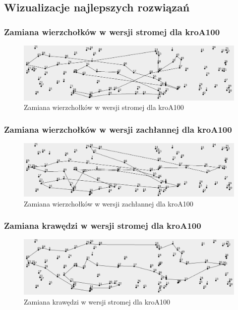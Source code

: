 \documentclass[a4paper]{article}
\begin{document}
\subsection{Wizualizacje najlepszych rozwiązań}

\subsubsection{Zamiana wierzchołków w wersji stromej dla kroA100}

\begin{figure}[H]
\centering
\includegraphics[width=\textwidth]{lab2/kroA_steepest_points}
\caption{Zamiana wierzchołków w wersji stromej dla kroA100}
\end{figure}

\subsubsection{Zamiana wierzchołków w wersji zachłannej dla kroA100}

\begin{figure}[H]
\centering
\includegraphics[width=\textwidth]{lab2/kroA_greedy_points}
\caption{Zamiana wierzchołków w wersji zachłannej dla kroA100}
\end{figure}

\subsubsection{Zamiana krawędzi w wersji stromej dla kroA100}

\begin{figure}[H]
\centering
\includegraphics[width=\textwidth]{lab2/kroA_steepest_corners}
\caption{Zamiana krawędzi w wersji stromej dla kroA100}
\end{figure}
\end{document}
